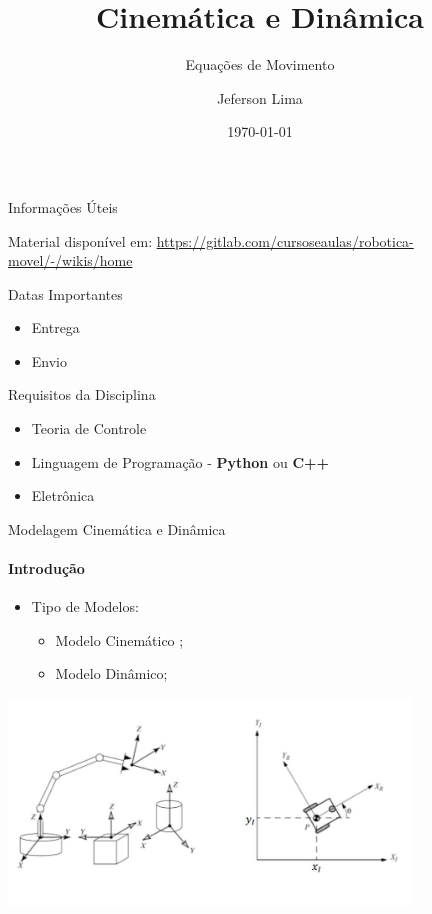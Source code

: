 \documentclass{beamer}
\title{Cinemática e Dinâmica}
\subtitle{Equações de Movimento}
\date{\today}
\author{Jeferson Lima}
\institute{\url{http://gitlab.com/jeferson.lima}}
\newcommand{\cmark}{\textcolor{green}{\ding{51}}}%
\newcommand{\pausar}{\pause}
\begin{document}
\maketitle

\begin{frame}{Informações Úteis}
	\begin{block}{Material disponível em:}
		\href{Robótica Móvel - Wiki}{https://gitlab.com/cursoseaulas/robotica-movel/-/wikis/home}
	\end{block}
	\pausar
	\begin{block}{Datas Importantes}
		\begin{itemize}
		\item Entrega
		\item Envio
		\end{itemize}
	\end{block}
	\pausar
	\begin{block}{Requisitos da Disciplina}
		\begin{itemize}
		\item Teoria de Controle
		\item Linguagem de Programação - \textbf{Python} ou \textbf{C++}
		\item Eletrônica
		\end{itemize}
	\end{block}
\end{frame}


\begin{frame}{Modelagem Cinemática e Dinâmica}
    \framesubtitle{Introdução}
    \begin{itemize}
        \item Tipo de Modelos:
        \begin{itemize}
            \item Modelo Cinemático \cmark;
            \item Modelo Dinâmico;
        \end{itemize}
    \end{itemize}
    \begin{center}
        \includegraphics[width=0.8\textwidth]{images/mecanismos.jpg}
    \end{center}
\end{frame}
\end{document}
